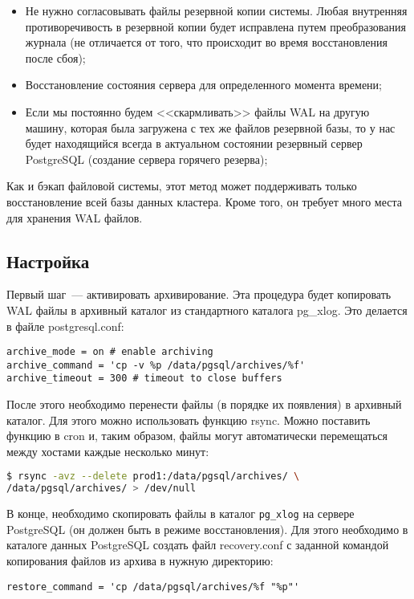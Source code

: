 \begin{itemize}
  \item Не нужно согласовывать файлы резервной копии системы. Любая внутренняя противоречивость в резервной копии будет исправлена путем преобразования журнала (не отличается от того, что происходит во время восстановления после сбоя);
  \item Восстановление состояния сервера для определенного момента времени;
  \item Если мы постоянно будем <<скармливать>> файлы WAL на другую машину, которая была загружена с тех же файлов резервной базы, то у нас будет находящийся всегда в актуальном состоянии резервный сервер PostgreSQL (создание сервера горячего резерва);
\end{itemize}

Как и бэкап файловой системы, этот метод может поддерживать только восстановление всей базы данных кластера. Кроме того, он требует много места для хранения WAL файлов.

\subsection{Настройка}

Первый шаг~--- активировать архивирование. Эта процедура будет копировать WAL файлы в архивный каталог из стандартного каталога pg\_xlog. Это делается в файле postgresql.conf:

\begin{lstlisting}[label=lst:backups15,caption=Настройка архивирования]
archive_mode = on # enable archiving
archive_command = 'cp -v %p /data/pgsql/archives/%f'
archive_timeout = 300 # timeout to close buffers
\end{lstlisting}

После этого необходимо перенести файлы (в порядке их появления) в архивный каталог. Для этого можно использовать функцию rsync. Можно поставить функцию в cron и, таким образом, файлы могут автоматически перемещаться между хостами каждые несколько минут:

\begin{lstlisting}[language=Bash,label=lst:backups16,caption=Копирование WAL файлов на другой хост]
$ rsync -avz --delete prod1:/data/pgsql/archives/ \
/data/pgsql/archives/ > /dev/null
\end{lstlisting}

В конце, необходимо скопировать файлы в каталог \lstinline!pg_xlog! на сервере PostgreSQL (он должен быть в режиме восстановления). Для этого необходимо в каталоге данных PostgreSQL создать файл recovery.conf с заданной командой копирования файлов из архива в нужную директорию:
\begin{lstlisting}[label=lst:backups17,caption=recovery.conf]
restore_command = 'cp /data/pgsql/archives/%f "%p"'
\end{lstlisting}


